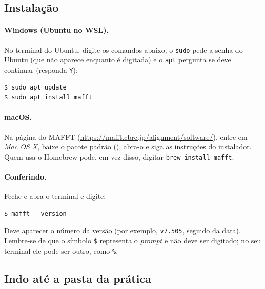 \documentclass[11pt,a4paper]{article}
\newcommand{\arq}[1]{\path{#1}}
\newcommand{\ui}[1]{\textit{#1}}
\begin{document}
\subsection{Instalação}

\paragraph{Windows (Ubuntu no WSL).} No terminal do Ubuntu, digite os comandos abaixo; o
\verb|sudo| pede a senha do Ubuntu (que não aparece enquanto é digitada) e o \verb|apt|
pergunta se deve continuar (responda \verb|Y|):
\begin{Verbatim}
$ sudo apt update
$ sudo apt install mafft
\end{Verbatim}

\paragraph{macOS.} Na página do MAFFT (\url{https://mafft.cbrc.jp/alignment/software/}),
entre em \ui{Mac OS X}, baixe o pacote padrão (\arq{.pkg}), abra-o e siga as instruções do
instalador. Quem usa o Homebrew pode, em vez disso, digitar \verb|brew install mafft|.

\paragraph{Conferindo.} Feche e abra o terminal e digite:
\begin{Verbatim}
$ mafft --version
\end{Verbatim}
Deve aparecer o número da versão (por exemplo, \verb|v7.505|, seguido da data). Lembre-se de que
o símbolo \verb|$| representa o \emph{prompt} e não deve ser digitado; no seu terminal ele
pode ser outro, como \verb|%|.

\subsection{Indo até a pasta da prática}
\end{document}
